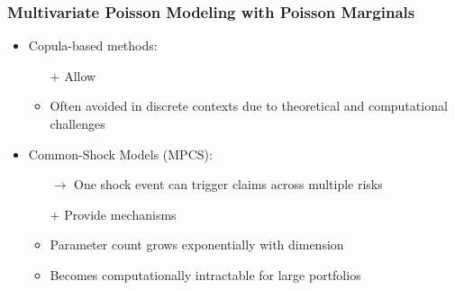 \documentclass[11pt,xcolor={dvipsnames},hyperref={pdftex,pdfpagemode=UseNone,hidelinks,pdfdisplaydoctitle=true},usepdftitle=false]{beamer}
\begin{document}
\begin{frame}
\frametitle{Multivariate Poisson Modeling with Poisson Marginals}
\begin{itemize}
        \item Copula-based methods:
        \begin{itemize}
            \item[+] Allow 
            \item Often avoided in discrete contexts due to theoretical and computational challenges\\
            \citep{genest2007primer, henn2022limitations}
        \end{itemize}
        
        \vfill
        \pause
        \item Common-Shock Models (MPCS):
        \begin{itemize}
        \item[$\rightarrow$] One shock event can trigger claims across multiple risks
        \item[+] Provide  mechanisms
            \item Parameter count grows exponentially with dimension
            \item Becomes computationally intractable for large portfolios\\
            \citep{karlis2003algorithm, ccekyay2023computing}
        \end{itemize}
\end{itemize}
\end{frame} 
\end{document}
